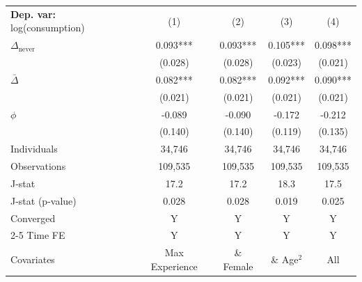 \begin{tabular}{l cccc} \toprule  \textbf{Dep. var:}  log(consumption) 
                    &\multicolumn{1}{c}{(1)}   &\multicolumn{1}{c}{(2)}   &\multicolumn{1}{c}{(3)}   &\multicolumn{1}{c}{(4)}   \\

\addlinespace
$\Delta_{\text{never}}$&       0.093***&       0.093***&       0.105***&       0.098***\\
                    &     (0.028)   &     (0.028)   &     (0.023)   &     (0.021)   \\

\addlinespace
$\bar{\Delta}$      &       0.082***&       0.082***&       0.092***&       0.090***\\
                    &     (0.021)   &     (0.021)   &     (0.021)   &     (0.021)   \\

\addlinespace
$\phi$              &      -0.089   &      -0.090   &      -0.172   &      -0.212   \\
                    &     (0.140)   &     (0.140)   &     (0.119)   &     (0.135)   \\
\addlinespace
Individuals         &      34,746   &      34,746   &      34,746   &      34,746   \\
Observations        &     109,535   &     109,535   &     109,535   &     109,535   \\
J-stat              &        17.2   &        17.2   &        18.3   &        17.5   \\
J-stat (p-value)    &       0.028   &       0.028   &       0.019   &       0.025   \\
Converged           &           Y   &           Y   &           Y   &           Y   \\
\cmidrule{2-5} Time FE & Y & Y & Y & Y \\ Covariates & Max Experience & \& Female & \& Age$^2$ & All \\ \bottomrule \end{tabular}
